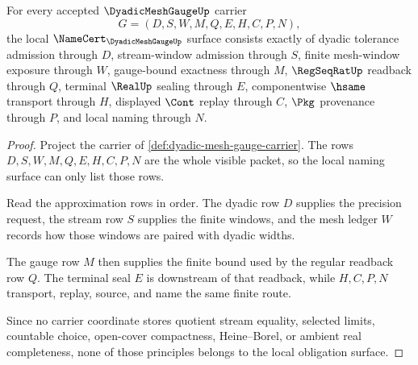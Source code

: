 \begin{theorem}
\label{thm:dyadic-mesh-gauge-namecert-obligations}
For every accepted $\DyadicMeshGaugeUp$ carrier
$$
G=(D,S,W,M,Q,E,H,C,P,N),
$$
the local $\NameCert_{\DyadicMeshGaugeUp}$ surface consists exactly of dyadic tolerance admission through $D$, stream-window admission through $S$, finite mesh-window exposure through $W$, gauge-bound exactness through $M$, $\RegSeqRatUp$ readback through $Q$, terminal $\RealUp$ sealing through $E$, componentwise $\hsame$ transport through $H$, displayed $\Cont$ replay through $C$, $\Pkg$ provenance through $P$, and local naming through $N$.
\end{theorem}
\begin{proof}
Project the carrier of \autoref{def:dyadic-mesh-gauge-carrier}. The rows $D,S,W,M,Q,E,H,C,P,N$ are the whole visible packet, so the local naming surface can only list those rows.

Read the approximation rows in order. The dyadic row $D$ supplies the precision request, the stream row $S$ supplies the finite windows, and the mesh ledger $W$ records how those windows are paired with dyadic widths.

The gauge row $M$ then supplies the finite bound used by the regular readback row $Q$. The terminal seal $E$ is downstream of that readback, while $H,C,P,N$ transport, replay, source, and name the same finite route.

Since no carrier coordinate stores quotient stream equality, selected limits, countable choice, open-cover compactness, Heine--Borel, or ambient real completeness, none of those principles belongs to the local obligation surface.
\end{proof}

